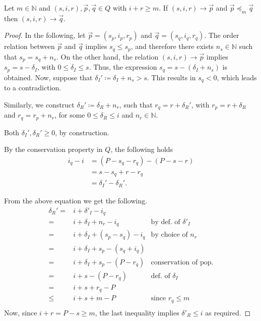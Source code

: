 \begin{lemma}
    Let $m \in \mathbb{N}$ and $(s,i,r),\vec{p},\vec{q} \in Q$ with $i + r \geq m$. If $(s,i,r) \rightarrow \vec{p}$ and $\vec{p} \preceq_m \vec{q}$ then $(s,i,r) \rightarrow \vec{q}$.
\end{lemma}
\begin{proof}
In the following, let $\vec{p}=(s_p,i_p,r_p)$ and $\vec{q}=(s_q,i_q,r_q)$. The order relation between $\vec{p}$ and $\vec{q}$ implies $s_q\leq s_p$, and therefore there exists $n_s\in \mathbb{N}$ such that $s_p=s_q+n_s$. On the other hand, the relation $(s,i,r) \rightarrow \vec{p}$ implies $s_p=s-\delta_I$, with $0 \leq \delta_I \leq s$. Thus, the expression $s_q=s-(\delta_I+n_s)$ is obtained. Now, suppose that $\delta_I' \coloneqq \delta_I+n_s>s$. This results in $s_q<0$, which leads to a contradiction. 

Similarly, we construct $\delta_R'\coloneqq \delta_R+n_r$, such that $r_q=r+\delta_R'$, with $r_p=r+\delta_R$ and $r_q=r_p+n_r$, for some $0 \leq \delta_R \leq i$ and $n_r\in \mathbb{N}$.

Both $\delta_I', \delta_R'\geq 0$, by construction.

By the conservation property in $Q$, the following holds
\begin{equation*}
\begin{split}
i_q-i&=(P-s_q-r_q)-(P-s-r) \\
&=s-s_q+r-r_q \\
&=\delta_I'-\delta_R'.
\end{split}
\end{equation*}

From the above equation we get the following.
\begin{align*}
\delta_R' = {} & i + \delta'_I - i_q\\
{}={} & i + \delta_I + n_r - i_q & \text{by def. of } \delta'_I\\
{}={} & i + \delta_I + (s_p - s_q) - i_q & \text{by choice of } n_r\\
{}={} & i + \delta_I + s_p - (s_q + i_q)\\
{}={} & i + \delta_I + s_p - (P - r_q) & \text{conservation of pop.}\\
{}={} & i + s - (P - r_q) & \text{def. of } \delta_I\\
{}={} & i + s + r_q - P\\
{}\leq{} & i + s + m - P & \text{since } r_q \leq m\\
\end{align*}
Now, since $i + r = P - s \geq m$, the last inequality implies $\delta'_R \leq i$ as required.
\end{proof}


